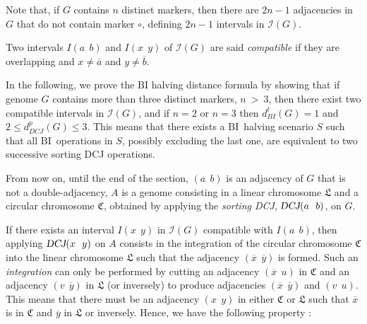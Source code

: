 \documentclass{llncs}
\newcommand{\fst}[1]{ \ensuremath{#1} }
\newcommand{\snd}[1]{ \ensuremath{\overline{#1}} }
\newcommand\aff[2]{\ensuremath{(\fst{#1}~~\fst{#2})}}
\newcommand\asf[2]{\ensuremath{(\snd{#1}~~\fst{#2})}}
\newcommand\afs[2]{\ensuremath{(\fst{#1}~~\snd{#2})}}
\newcommand\ass[2]{\ensuremath{(\snd{#1}~~\snd{#2})}}
\def\BI{\ensuremath{\mbox{BI}}}
\def\DCJ{\ensuremath{\mbox{\sl DCJ}}}
\begin{document}
\begin{remark}
Note that, if $G$ contains $n$ distinct markers, then there are $2n-1$ adjacencies in $G$ that do not contain marker $\circ$,  defining $2n-1$ intervals in  $\mathcal{I}(G)$.
\label{maxEdges}
\end{remark}

\begin{definition}
Two  intervals $I\aff{a}{b}$ and $I\aff{x}{y}$ of $\mathcal{I}(G)$ are said \emph{compatible} if they are overlapping and  $x \neq \snd{a}$ and $y \neq \snd{b}$.
\end{definition}



In the following, we prove the BI halving distance formula by showing that if genome $G$ contains more than three distinct markers, $n~>~3$,  then there exist two compatible intervals in $\mathcal{I}(G)$, and if $n=2$ or $n=3$ then $d^t_{BI}(G)=1$ and $2 \leq d^p_{DCJ}(G) \leq 3$.
This means that there exists a \BI ~halving scenario $S$ such that all \BI ~operations in $S$, possibly excluding the last one, are equivalent to two successive sorting DCJ operations.






From now on, until the end of the section,
$\aff{a}{b}$ is an adjacency of $G$ that is not a double-adjacency, $A$ is a genome consisting in a linear chromosome $\mathfrak{L}$ and a circular chromosome $\mathfrak{C}$, obtained by applying the \emph{sorting DCJ}, $\DCJ\aff{a}{b}$, on $G$.

If there exists an interval $I\aff{x}{y}$ in $\mathcal{I}(G)$ compatible with  $I\aff{a}{b}$, then applying $\DCJ\aff{x}{y}$ on $A$ consists in the integration of the circular chromosome $\mathfrak{C}$ into the linear chromosome $\mathfrak{L}$ such that the adjacency $\ass{x}{y}$ is formed.
Such an \emph{integration} can only be performed by cutting an adjacency $\asf{x}{u}$ in $\mathfrak{C}$ and an adjacency $\afs{v}{y}$ in $\mathfrak{L}$ (or inversely) to produce adjacencies $\ass{x}{y}$ and $\aff{v}{u}$.  This means that there must be an adjacency \aff{x}{y} in either $\mathfrak{C}$ or $\mathfrak{L}$ such that $\snd{x}$ is in $\mathfrak{C}$ and $\snd{y}$ in $\mathfrak{L}$ or inversely.
Hence, we have the following property :
\end{document}
